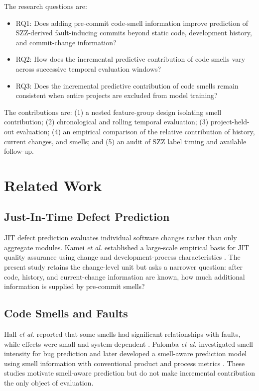 \documentclass[conference]{IEEEtran}
\begin{document}
The research questions are:
\begin{itemize}
\item RQ1: Does adding pre-commit code-smell information improve prediction of SZZ-derived fault-inducing commits beyond static code, development history, and commit-change information?
\item RQ2: How does the incremental predictive contribution of code smells vary across successive temporal evaluation windows?
\item RQ3: Does the incremental predictive contribution of code smells remain consistent when entire projects are excluded from model training?
\end{itemize}

The contributions are: (1) a nested feature-group design isolating smell contribution; (2) chronological and rolling temporal evaluation; (3) project-held-out evaluation; (4) an empirical comparison of the relative contribution of history, current changes, and smells; and (5) an audit of SZZ label timing and available follow-up.

\section{Related Work}
\subsection{Just-In-Time Defect Prediction}
JIT defect prediction evaluates individual software changes rather than only aggregate modules. Kamei \textit{et al.} established a large-scale empirical basis for JIT quality assurance using change and development-process characteristics \cite{kamei2013jit}. The present study retains the change-level unit but asks a narrower question: after code, history, and current-change information are known, how much additional information is supplied by pre-commit smells?

\subsection{Code Smells and Faults}
Hall \textit{et al.} reported that some smells had significant relationships with faults, while effects were small and system-dependent \cite{hall2014smells}. Palomba \textit{et al.} investigated smell intensity for bug prediction and later developed a smell-aware prediction model using smell information with conventional product and process metrics \cite{palomba2016teen,palomba2019smellaware}. These studies motivate smell-aware prediction but do not make incremental contribution the only object of evaluation.
\end{document}
